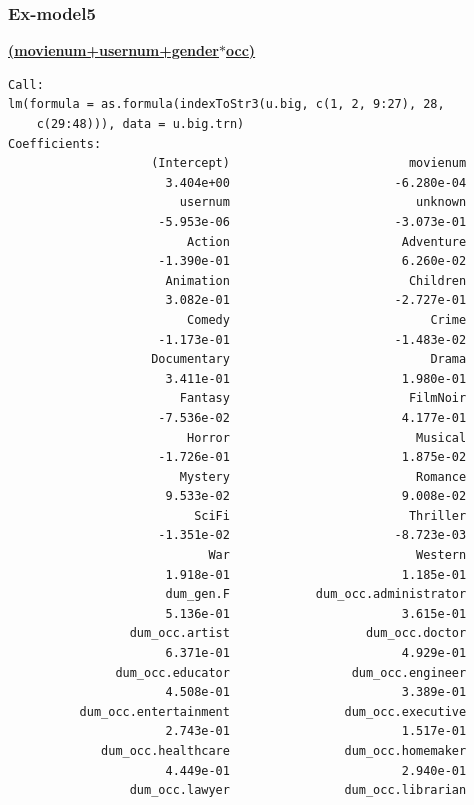\documentclass[11pt]{article}
\begin{document}
\subsubsection{Ex-model5}
\textbf{\underline{(movienum+usernum+gender$*$occ)}}
\begin{verbatim}
Call:
lm(formula = as.formula(indexToStr3(u.big, c(1, 2, 9:27), 28, 
    c(29:48))), data = u.big.trn)
Coefficients:
                    (Intercept)                         movienum  
                      3.404e+00                       -6.280e-04  
                        usernum                          unknown  
                     -5.953e-06                       -3.073e-01  
                         Action                        Adventure  
                     -1.390e-01                        6.260e-02  
                      Animation                         Children  
                      3.082e-01                       -2.727e-01  
                         Comedy                            Crime  
                     -1.173e-01                       -1.483e-02  
                    Documentary                            Drama  
                      3.411e-01                        1.980e-01  
                        Fantasy                         FilmNoir  
                     -7.536e-02                        4.177e-01  
                         Horror                          Musical  
                     -1.726e-01                        1.875e-02  
                        Mystery                          Romance  
                      9.533e-02                        9.008e-02  
                          SciFi                         Thriller  
                     -1.351e-02                       -8.723e-03  
                            War                          Western  
                      1.918e-01                        1.185e-01  
                      dum_gen.F            dum_occ.administrator  
                      5.136e-01                        3.615e-01  
                 dum_occ.artist                   dum_occ.doctor  
                      6.371e-01                        4.929e-01  
               dum_occ.educator                 dum_occ.engineer  
                      4.508e-01                        3.389e-01  
          dum_occ.entertainment                dum_occ.executive  
                      2.743e-01                        1.517e-01  
             dum_occ.healthcare                dum_occ.homemaker  
                      4.449e-01                        2.940e-01  
                 dum_occ.lawyer                dum_occ.librarian  

\end{verbatim}
\end{document}
